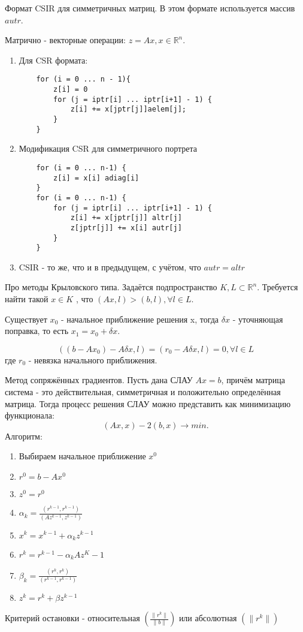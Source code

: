 \documentclass[__main__.tex]{subfiles}
\begin{document}
Формат CSIR для симметричных матриц. В этом формате используется массив $autr$.

Матрично - векторные операции: $z = Ax, x \in \mathbb{R}^n$.

\begin{enumerate}
	\item Для CSR формата:
	\begin{lstlisting}
	for (i = 0 ... n - 1){
		z[i] = 0
		for (j = iptr[i] ... iptr[i+1] - 1) {
			z[i] += x[jptr[j]]aelem[j];
		}
	}
	\end{lstlisting}
	
	\item Модификация CSR для симметричного портрета
	\begin{lstlisting}
	for (i = 0 ... n-1) {
		z[i] = x[i] adiag[i]
	}
	for (i = 0 ... n-1) {
		for (j = iptr[i] ... iptr[i+1] - 1) {
			z[i] += x[jptr[j]] altr[j]
			z[jptr[j]] += x[i] autr[j]
		}
	} 
	\end{lstlisting}
	
	\item CSIR - то же, что и в предыдущем, с учётом, что $autr = altr$
\end{enumerate}

Про методы Крыловского типа. Задаётся подпространство $K, L \subset \mathbb{R}^n$. Требуется найти такой $x \in K$ , что $\left(Ax, l\right) > \left(b, l\right), \forall l \in L $.

Существует $x_0$ - начальное приближение решения x, тогда $\delta x$ - уточняющая поправка, то есть $x_1 = x_0 + \delta x$.

$$
\left(\left(b - A x_0\right) - A \delta x, l\right) = \left(r_0 - A\delta x, l\right) = 0, \forall l \in L
$$
где $r_0$ - невязка начального приближения.

Метод сопряжённых градиентов. Пусть дана СЛАУ $Ax = b$, причём матрица система - это действительная, симметричная и положительно определённая  матрица. Тогда процесс решения СЛАУ можно представить как минимизацию функционала: $$\left(Ax, x\right) - 2 \left(b,x\right) \rightarrow min.$$ Алгоритм:

\begin{enumerate}
	\item Выбираем начальное приближение $x^0$
	
	\item $r^0 = b - Ax^0$
	
	\item $z^0 = r^0$
	
	\item $\alpha_k = \frac{\left(r^{k-1}, r^{k - 1}\right)}{\left(Az^{k-1}, z^{k-1}\right)}$
	
	\item $x^k = x^{k-1} + \alpha_k z^{k-1}$
	
	\item $r^k = r^{k-1} - \alpha_k A z^K-1$
	
	\item $\beta_k = \frac{\left(r^k, r^k\right)}{\left(r^{k-1}, r^{k-1}\right)}$
	
	\item $z^k = r^k + \beta z^{k-1}$
\end{enumerate}

Критерий остановки - относительная $\left(\frac{\| r^k \|}{\| b \|}\right)$ или абсолютная $\left(\| r^k \|\right)$
\end{document}
